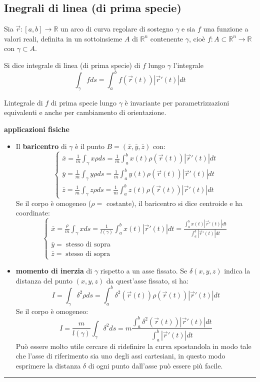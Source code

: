 \subsection{Inegrali di linea (di prima specie)}
Sia $\vec{r}: [a,b] \rightarrow \mathbb{R}$ un arco di curva regolare di sostegno $\gamma$ e sia $f$ una funzione a valori reali, definita in un sottoinsieme $A$ di $\mathbb{R}^n$ contenente $\gamma$, cioè $f:A\subset \mathbb{R}^n \rightarrow \mathbb{R}$ con $\gamma \subset A$.
\begin{tcolorbox}
Si dice integrale di linea (di prima specie) di $f$ lungo $\gamma$ l'integrale
\[
    \int_{\gamma} f ds = \int_{a}^{b}f(\vec{r}(t))|\vec{r}'(t)|dt
\]
\end{tcolorbox}
\begin{tcolorbox}
Lintegrale di $f$ di prima specie lungo $\gamma$ è invariante per parametrizzazioni equivalenti e anche per cambiamento di orientazione.
\end{tcolorbox}
\textbf{applicazioni fisiche}
\begin{tcolorbox}
\begin{itemize}
    \item Il \textbf{baricentro} di $\gamma$ è il punto $B = (\bar{x},\bar{y},\bar{z})$ con:
    \[
        \begin{cases}
            \bar{x} = \frac{1}{m}\int_\gamma x\rho ds = \frac{1}{m}\int_{a}^{b}x(t)\rho(\vec{r}(t))|\vec{r}'(t)|dt\\
            \bar{y} = \frac{1}{m}\int_\gamma y\rho ds = \frac{1}{m}\int_{a}^{b}y(t)\rho(\vec{r}(t))|\vec{r}'(t)|dt\\
            \bar{z} = \frac{1}{m}\int_\gamma z\rho ds = \frac{1}{m}\int_{a}^{b}z(t)\rho(\vec{r}(t))|\vec{r}'(t)|dt
        \end{cases}
    \]
    Se il corpo è omogeneo ($\rho =$ costante), il baricentro si dice centroide e ha coordinate:
    \[
        \begin{cases}
            \bar{x} = \frac{\rho}{m}\int_\gamma x ds = \frac{1}{l(\gamma)}\int_{a}^{b}x(t)|\vec{r}'(t)|dt = \frac{\int_{a}^{b}x(t)|\vec{r}'(t)|dt}{\int_{a}^{b}|\vec{r}'(t)|dt}\\
            \bar{y} = \;\text{stesso di sopra}\\   
            \bar{z} = \;\text{stesso di sopra}
        \end{cases}
    \]
    \item \textbf{momento di inerzia} di $\gamma$ rispetto a un asse fissato. Se $\delta(x,y,z)$ indica la distanza del punto $(x,y,z)$ da quest'asse fissato, si ha:
    \[
        I = \int_\gamma \delta^2 \rho ds = \int_{a}^{b}\delta^2(\vec{r}(t))\rho(\vec{r}(t))|\vec{r}'(t)|dt
    \]
    Se il corpo è omogeneo:
    \[
        I = \frac{m}{l(\gamma)}\int_\gamma \delta^2ds = m \frac{\int_{a}^{b}\delta^2(\vec{r}(t))|\vec{r}'(t)|dt}{\int_{a}^{b}|\vec{r}'(t)|dt}
    \]
    Può essere molto utile cercare di ridefinire la curva spostandola in modo tale che l'asse di riferimento sia uno degli assi cartesiani, in questo modo esprimere la distanza $\delta$ di ogni punto dall'asse può essere più facile.
\end{itemize}
\end{tcolorbox}
\rule{\textwidth}{2pt}
